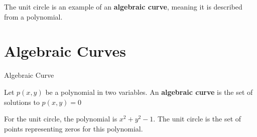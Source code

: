 \documentclass{ximera}
\begin{document}
The unit circle is an example of an \textbf{algebraic curve}, meaning it is described from a polynomial.





\section{Algebraic Curves}



\begin{definition}  Algebraic Curve


Let $p(x,y)$ be a polynomial in two variables.  An \textbf{algebraic curve} is the set of solutions to $p(x,y)=0$ 


\end{definition}



For the unit circle, the polynomial is $x^2 + y^2 - 1$.  The unit circle is the set of points representing zeros for this polynomial.
\end{document}
